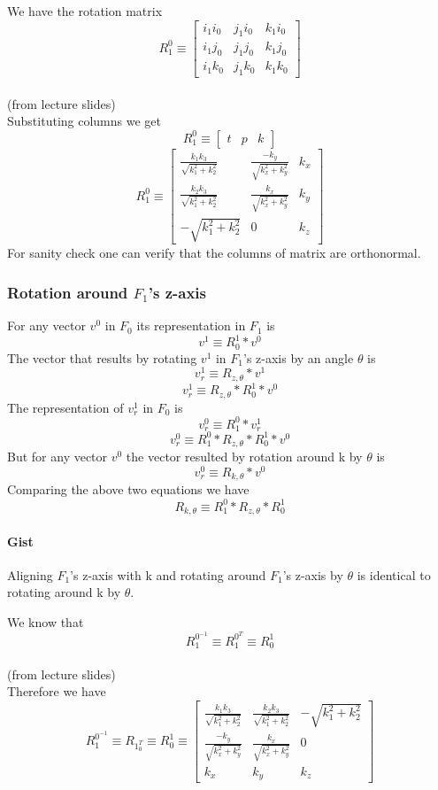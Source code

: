 \documentclass[12pt]{article}
\newcommand{\fromlectures}{{\\ \color{blue} \hspace*{\fill}(from lecture slides)} \\}
\begin{document}
We have the rotation matrix
\[
  R_1^0 \equiv \begin{bmatrix} i_1i_0 & j_1i_0 & k_1i_0 \\ i_1j_0 & j_1j_0 & k_1j_0 \\ i_1k_0 & j_1k_0 & k_1k_0 \end{bmatrix}
\]
\fromlectures
Substituting columns we get
\[
  R_1^0 \equiv \begin{bmatrix} t & p & k \end{bmatrix}
\]
\[
  R_1^0 \equiv
  \begin{bmatrix}
  \frac{k_1k_3}{\sqrt{k_1^2 + k_2^2}} & \frac{-k_y}{\sqrt{k_x^2 + k_y^2}}  & k_x \\
  \frac{k_2k_3}{\sqrt{k_1^2 + k_2^2}} & \frac{k_x}{\sqrt{k_x^2 + k_y^2}}   & k_y \\
  -\sqrt{k_1^2 + k_2^2}               & 0 & k_z
  \end{bmatrix}
\]
For sanity check one can verify that the columns of matrix are orthonormal.

\subsubsection*{Rotation around $F_1$'s z-axis}
For any vector $ v^0 $ in $ F_0 $ its representation in $ F_1 $ is
\[
  v^1 \equiv R_0^1 * v^0
\]
The vector that results by rotating $ v^1 $ in $ F_1 $'s z-axis by an angle $ \theta $ is
\[
  v^1_r \equiv R_{z,\theta} * v^1
\]
\[
  v^1_r \equiv R_{z,\theta} * R_0^1 * v^0
\]
The representation of $ v^1_r $ in $ F_0 $ is
\[
  v^0_r \equiv R_1^0 * v^1_r
\]
\[
  v^0_r \equiv R_1^0 * R_{z,\theta} * R_0^1 * v^0
\]
But for any vector $ v^0 $ the vector resulted by rotation around k by $\theta$ is
\[
  v^0_r \equiv R_{k,\theta} * v^0
\]
Comparing the above two equations we have
\[
  R_{k,\theta} \equiv R_1^0 * R_{z,\theta} * R_0^1
\]
\paragraph{Gist} Aligning $ F_1 $'s z-axis with k and rotating around $ F_1 $'s z-axis by $ \theta $ is identical to rotating around k by $ \theta $.

We know that
\[
  R_1^{0^{-1}} \equiv R_1^{0^T} \equiv R_0^1
\]
\fromlectures
Therefore we have
\[
  R_1^{0^{-1}} \equiv R_{1_0^T} \equiv R_0^1 \equiv
  \begin{bmatrix}
  \frac{k_1k_3}{\sqrt{k_1^2 + k_2^2}} & \frac{k_2k_3}{\sqrt{k_1^2 + k_2^2}} & -\sqrt{k_1^2 + k_2^2} \\
  \frac{-k_y}{\sqrt{k_x^2 + k_y^2}}  & \frac{k_x}{\sqrt{k_x^2 + k_y^2}}   & 0 \\
  k_x & k_y & k_z
  \end{bmatrix}
\]
\end{document}
